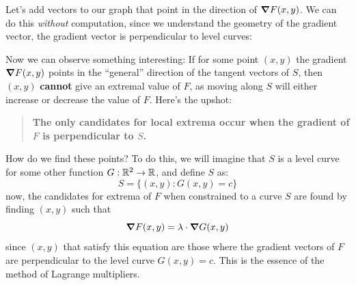 \documentclass{ximera}
\begin{document}
Let's add vectors to our graph that point in the direction of $\boldsymbol\nabla
F(x,y)$. We can do this \textit{without} computation, since we
understand the geometry of the gradient vector, the gradient vector is
perpendicular to level curves:
\begin{image}
\end{image}

Now we can observe something interesting: If for some point $(x,y)$
the gradient $\boldsymbol\nabla F(x,y)$ points in the ``general'' direction of the
tangent vectors of $S$, then $(x,y)$ \textbf{cannot} give an extremal
value of $F$, as moving along $S$ will either increase or decrease the
value of $F$. Here's the upshot:
\begin{quote}
  \textbf{The only candidates for local extrema occur when the
    gradient of $F$ is perpendicular to $S$.}
\end{quote}
How do we find these points? To do this, we will imagine that $S$ is a
level curve for some other function $G:\mathbb R^2\to\mathbb R$, and define $S$ as:
\[
S = \{(x,y):G(x,y)= c\}
\]
now, the candidates for extrema of $F$ when constrained to a curve $S$
are found by finding $(x,y)$ such that
\[
\boldsymbol\nabla F(x,y) =  \lambda \cdot \boldsymbol\nabla G(x,y)
\]
since $(x,y)$ that satisfy this equation are those where the gradient
vectors of $F$ are perpendicular to the level curve $G(x,y)= c$. This
is the essence of the method of Lagrange multipliers.
\end{document}
